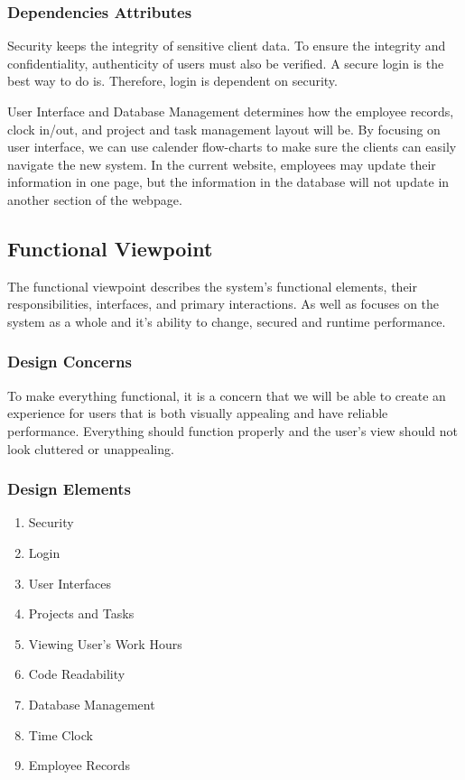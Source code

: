 \documentclass[letterpaper,10pt,titlepage,journal,compsoc,draftclsnofoot,onecolumn]{IEEEtran}
\newcommand\tab[1][1cm]{\hspace*{#1}}
\begin{document}
\subsubsection{Dependencies Attributes}

\tab Security keeps the integrity of sensitive client data. To ensure the integrity and confidentiality, authenticity of users must also be verified. A secure login is the best way to do is. Therefore, login is dependent on security.\newline


\tab User Interface and Database Management determines how the employee records, clock in/out, and project and task management layout will be.  By focusing on user interface, we can use calender flow-charts to make sure the clients can easily navigate the new system. In the current website, employees may update their information in one page, but the information in the database will not update in another section of the webpage. \newline

\subsection{Functional Viewpoint}

The functional viewpoint describes the system's functional elements, their responsibilities, interfaces, and primary interactions. As well as focuses on the system as a whole and it's ability to change, secured and runtime performance.

\subsubsection{Design Concerns}

To make everything functional, it is a concern that we will be able to create an experience for users that is both visually appealing and have reliable performance. Everything should function properly and the user's view should not look cluttered or unappealing. 

\subsubsection{Design Elements}

\begin{enumerate}
\item{Security}
\item{Login}
\item{User Interfaces}
\item{Projects and Tasks}
\item{Viewing User's Work Hours}
\item{Code Readability}
\item{Database Management}
\item{Time Clock}
\item{Employee Records}
\end{enumerate}
\end{document}
